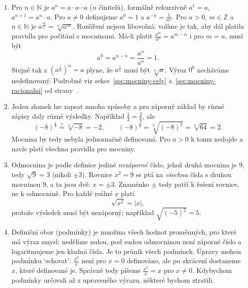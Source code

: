 \begin{enumerate}[label=\textbf{\arabic*.}, leftmargin=*, itemsep=0.8em]
  \item {}
  Pro $n\in\mathbb{N}$ je $a^n = a\cdot a\cdots a$ ($n$ činitelů), formálně rekurzivně $a^1 = a$, $a^{n+1} = a^n\cdot a$. Pro $a\neq 0$ definujeme $a^0 = 1$ a $a^{-n} = \frac{1}{a^n}$. Pro $a > 0$, $m\in\mathbb{Z}$ a $n\in\mathbb{N}$ je $a^{\frac{m}{n}} = \sqrt[n]{a^m}$. Rozšíření nejsou libovolná: volíme je tak, aby dál platila pravidla pro počítání s mocninami. Má-li platit $\frac{a^m}{a^n} = a^{m-n}$ i pro $m = n$, musí být
  \begin{equation*}
    a^0 = a^{n-n} = \frac{a^n}{a^n} = 1.
  \end{equation*}
  Stejně tak z ${(a^{\frac{1}{n}})}^n = a$ plyne, že $a^{\frac{1}{n}}$ musí být $\sqrt[n]{a}$. Výraz $0^0$ necháváme nedefinovaný. Podrobně viz sekce~\ref{sec:mocniny-cely} a~\ref{sec:mocniny-racionalni} od strany~\pageref{sec:mocniny-cely}.

  \item {}
  Jeden zlomek lze zapsat mnoha způsoby a pro záporný základ by různé zápisy daly různé výsledky. Například $\frac{1}{3} = \frac{2}{6}$, ale
  \begin{equation*}
    {(-8)}^{\frac{1}{3}} \overset{?}{=} \sqrt[3]{-8} = -2, \qquad {(-8)}^{\frac{2}{6}} = \sqrt[6]{{(-8)}^2} = \sqrt[6]{64} = 2.
  \end{equation*}
  Mocnina by tedy nebyla jednoznačně definovaná. Pro $a > 0$ k tomu nedojde a navíc platí všechna pravidla pro mocniny.

  \item {}
  Odmocnina je podle definice jediné \emph{nezáporné} číslo, jehož druhá mocnina je $9$, tedy $\sqrt{9} = 3$ (nikoli $\pm 3$). Rovnice $x^2 = 9$ se ptá na \emph{všechna} čísla s druhou mocninou $9$, a ta jsou dvě: $x = \pm 3$. Znaménko $\pm$ tedy patří k řešení rovnice, ne k odmocnině. Pro každé reálné $x$ platí
  \begin{equation*}
    \sqrt{x^2} = |x|,
  \end{equation*}
  protože výsledek musí být nezáporný; například $\sqrt{{(-5)}^2} = 5$.

  \item {}
  Definiční obor (podmínky) je množina všech hodnot proměnných, pro které má výraz smysl: nedělíme nulou, pod sudou odmocninou není záporné číslo a logaritmujeme jen kladná čísla. Je to průnik všech podmínek. Úpravy mohou podmínku `schovat': $\frac{x^2}{x}$ není pro $x = 0$ definováno, ale po zkrácení dostaneme $x$, které definované je. Správně tedy píšeme $\frac{x^2}{x} = x$ pro $x\neq 0$. Kdybychom podmínky určovali až z upraveného výrazu, některé bychom ztratili. 


\end{enumerate}
